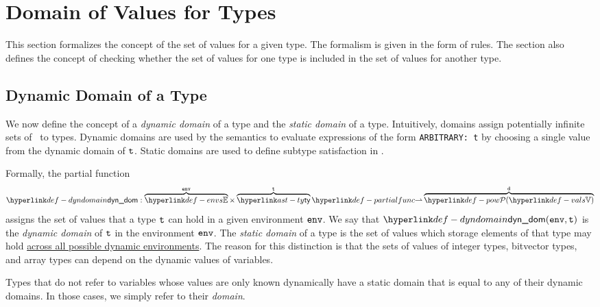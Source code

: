 \section{Domain of Values for Types\label{sec:DomainOfValuesForTypes}}
This section formalizes the concept of the set of values for a given type.
The formalism is given in the form of rules.
%
The section also defines the concept of checking whether the set of values
for one type is included in the set of values for another type.

\subsection{Dynamic Domain of a Type\label{sec:DynDomain}}
\hypertarget{def-dyndomain}{}

We now define the concept of a \emph{dynamic domain} of a type
and the \emph{static domain} of a type.
Intuitively, domains assign potentially infinite sets of \nativevalues\ to types.
Dynamic domains are used by the semantics to evaluate expressions of the form \texttt{ARBITRARY: t}
by choosing a single value from the dynamic domain of $\texttt{t}$.
Static domains are used to define subtype satisfaction in .

Formally, the partial function
\[
  \dynamicdomain : \overname{\envs}{\env} \times \overname{\ty}{\vt}
  \partialto \overname{\pow{\vals}}{\vd}
\]
assigns the set of values that a type $\texttt{t}$ can hold in a given environment $\texttt{env}$.
%
We say that $\dynamicdomain(\env, \vt)$ is the \emph{dynamic domain} of $\texttt{t}$
in the environment $\texttt{env}$.
%
The \emph{static domain} of a type is the set of values which storage elements of that type may hold
\underline{across all possible dynamic environments}.
%
The reason for this distinction is that the sets of values
of integer types, bitvector types, and array types can depend on the dynamic values of variables.

Types that do not refer to variables whose values are only known dynamically have
a static domain that is equal to any of their dynamic domains.
In those cases, we simply refer to their \emph{domain}.

